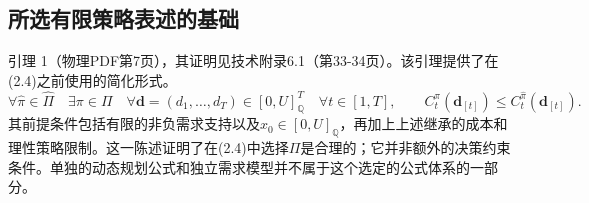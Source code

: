 \documentclass{article}
\begin{document}
\subsection*{所选有限策略表述的基础}
引理 1（物理PDF第7页），其证明见技术附录6.1（第33-34页）。该引理提供了在(2.4)之前使用的简化形式。
\[
\forall\hat\pi\in\hat\Pi\quad\exists\pi\in\Pi\quad
\forall\mathbf d=(d_1,\ldots,d_T)\in[0,U]_{\mathbb{Q}}^T\quad
\forall t\in[1,T],\qquad
C_t^\pi(\mathbf d_{[t]})\leq C_t^{\hat\pi}(\mathbf d_{[t]}).
\]
其前提条件包括有限的非负需求支持以及\(x_0\in[0,U]_{\mathbb{Q}}\)，再加上上述继承的成本和理性策略限制。这一陈述证明了在(2.4)中选择\(\Pi\)是合理的；它并非额外的决策约束条件。单独的动态规划公式和独立需求模型并不属于这个选定的公式体系的一部分。
\end{document}
